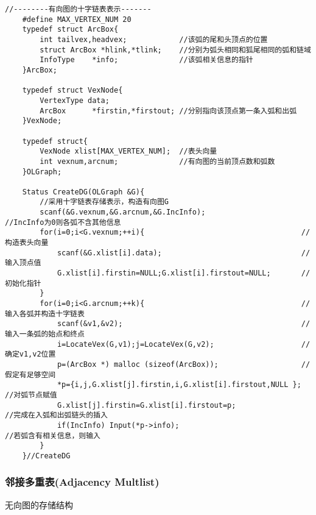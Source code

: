 \documentclass[UTF8]{ctexart}
\begin{document}
\begin{lstlisting}[style=v1]
    //--------有向图的十字链表表示-------
    #define MAX_VERTEX_NUM 20
    typedef struct ArcBox{
        int tailvex,headvex;            //该弧的尾和头顶点的位置
        struct ArcBox *hlink,*tlink;    //分别为弧头相同和狐尾相同的弧和链域
        InfoType    *info;              //该弧相关信息的指针
    }ArcBox;

    typedef struct VexNode{
        VertexType data;
        ArcBox      *firstin,*firstout; //分别指向该顶点第一条入弧和出弧          
    }VexNode;

    typedef struct{
        VexNode xlist[MAX_VERTEX_NUM];  //表头向量
        int vexnum,arcnum;              //有向图的当前顶点数和弧数
    }OLGraph;

    Status CreateDG(OLGraph &G){
        //采用十字链表存储表示，构造有向图G
        scanf(&G.vexnum,&G.arcnum,&G.IncInfo);                      //IncInfo为0则各弧不含其他信息
        for(i=0;i<G.vexnum;++i){                                    //构造表头向量
            scanf(&G.xlist[i].data);                                //输入顶点值
            G.xlist[i].firstin=NULL;G.xlist[i].firstout=NULL;       //初始化指针
        }
        for(i=0;i<G.arcnum;++k){                                    //输入各弧并构造十字链表
            scanf(&v1,&v2);                                         //输入一条弧的始点和终点
            i=LocateVex(G,v1);j=LocateVex(G,v2);                    //确定v1,v2位置
            p=(ArcBox *) malloc (sizeof(ArcBox));                   //假定有足够空间
            *p={i,j,G.xlist[j].firstin,i,G.xlist[i].firstout,NULL }; //对弧节点赋值 
            G.xlist[j].firstin=G.xlist[i].firstout=p;                //完成在入弧和出弧链头的插入
            if(IncInfo) Input(*p->info);                             //若弧含有相关信息，则输入      
        }
    }//CreateDG
\end{lstlisting}

  
\newpage

\subsubsection{邻接多重表(Adjacency Multlist)}

无向图的存储结构
\end{document}
